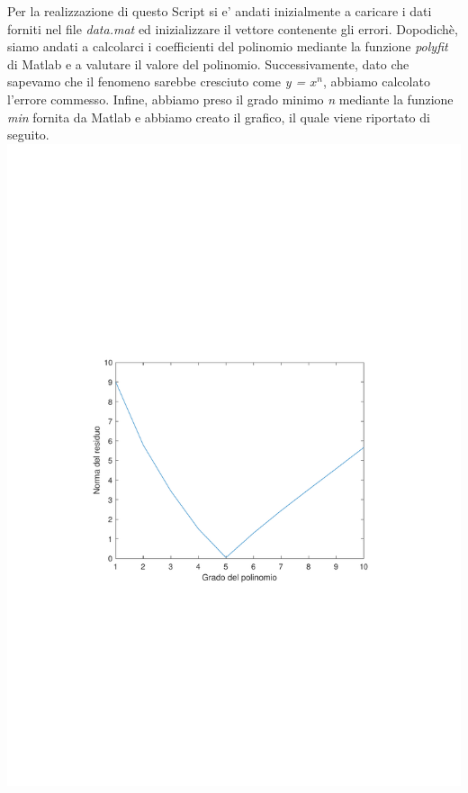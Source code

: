 \documentclass[10pt,a4paper]{article}
\begin{document}
Per la realizzazione di questo Script si e' andati inizialmente a caricare i dati forniti nel file 
\textit{data.mat} ed inizializzare il vettore contenente gli errori.
Dopodichè, siamo andati a calcolarci i coefficienti del polinomio mediante la funzione \textit{polyfit} di
Matlab e a valutare il valore del polinomio.
Successivamente, dato che sapevamo che il fenomeno sarebbe cresciuto come \textit{y = $ x^n $}, abbiamo
calcolato l'errore commesso.
Infine, abbiamo preso il grado minimo \textit{n} mediante la funzione \textit{min} fornita da Matlab e abbiamo
creato il grafico, il quale viene riportato di seguito.
\\
\includegraphics*[scale=0.80]{./esercizi/imgs/grafico_24.pdf}
\end{document}
